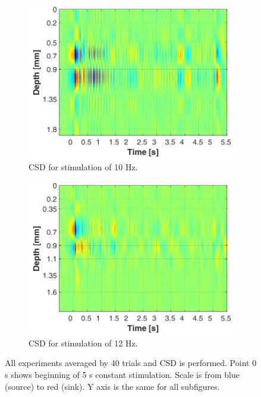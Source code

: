 \documentclass{pracalicmgr}
\begin{document}
\begin{figure}[H]\ContinuedFloat
	
	\begin{subfigure}{.5\textwidth}
		\centering
		\includegraphics[width=1.\linewidth]{csd_10Hz_5s.png}
		\caption{CSD for stimulation of 10 Hz.}
		\label{rys:csd_10Hz}
	\end{subfigure}
	\begin{subfigure}{.5\textwidth}
		\centering
		\includegraphics[width=1.\linewidth]{csd_12Hz_5s.png}
		\caption{CSD for stimulation of 12 Hz.}
		\label{rys:csd_12Hz}
	\end{subfigure}
	
	\caption{All experiments averaged by 40 trials and CSD is performed. Point 0 s shows beginning of 5 s constant stimulation. Scale is from blue (source) to red (sink). Y axis is the same for all subfigures.}
	\label{rys:csd}
	
	\end{figure}
\end{document}
